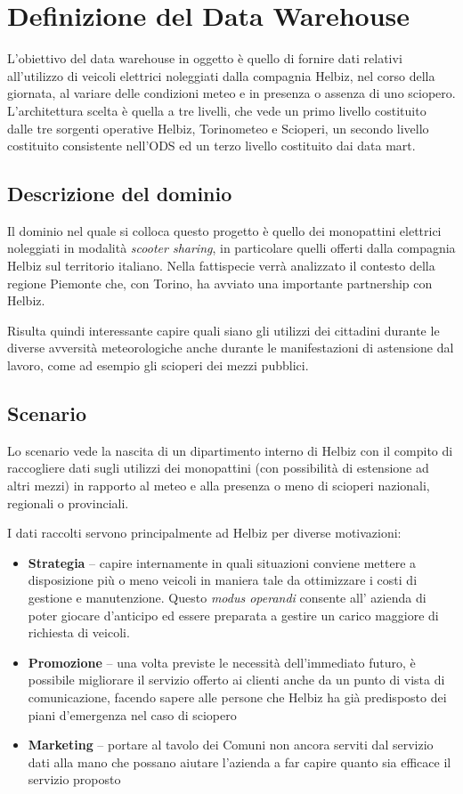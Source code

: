 \chapter{Definizione del Data Warehouse}

L'obiettivo del data warehouse in oggetto è quello di fornire dati relativi
all'utilizzo di veicoli elettrici noleggiati dalla compagnia Helbiz, nel corso
della giornata, al variare delle condizioni meteo e in presenza o assenza di uno
sciopero.
L'architettura scelta è quella a tre livelli, che vede un primo livello costituito
dalle tre sorgenti operative Helbiz, Torinometeo e Scioperi, un secondo livello
costituito consistente nell'ODS ed un terzo livello costituito dai data mart.

\section{Descrizione del dominio}
Il dominio nel quale si colloca questo progetto è quello dei monopattini elettrici noleggiati in
modalità \emph{scooter sharing}, in particolare quelli offerti dalla compagnia Helbiz sul territorio italiano.
Nella fattispecie verrà analizzato il contesto della regione Piemonte che, con Torino, ha avviato una importante
partnership con Helbiz.

Risulta quindi interessante capire quali siano gli utilizzi dei cittadini durante le diverse avversità meteorologiche
anche durante le manifestazioni di astensione dal lavoro, come ad esempio gli scioperi dei mezzi pubblici.


\section{Scenario}
Lo scenario vede la nascita di un dipartimento interno di Helbiz con il compito di raccogliere dati sugli
utilizzi dei monopattini (con possibilità di estensione ad altri mezzi) in rapporto al meteo e alla presenza
o meno di scioperi nazionali, regionali o provinciali.

I dati raccolti servono principalmente ad Helbiz per diverse motivazioni:
\begin{itemize}
	\item{\textbf{Strategia} -- capire internamente in quali situazioni conviene mettere a disposizione più o meno veicoli in maniera tale da ottimizzare i costi di gestione e manutenzione.
	Questo \emph{modus operandi} consente all' azienda di poter giocare d'anticipo ed essere preparata a gestire un carico maggiore di richiesta di veicoli.}
	\item{\textbf{Promozione} -- una volta previste le necessità dell'immediato futuro, è possibile migliorare il servizio offerto ai clienti anche da un punto di vista di comunicazione,
	facendo sapere alle persone che Helbiz ha già predisposto dei piani d'emergenza nel caso di sciopero}
	\item{\textbf{Marketing} -- portare al tavolo dei Comuni non ancora serviti dal servizio dati alla mano che possano aiutare l'azienda a far capire quanto sia efficace il servizio proposto}
\end{itemize}

